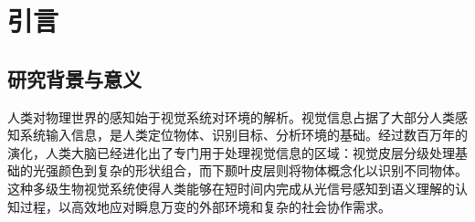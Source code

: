 
\chapter{引言}
\section{研究背景与意义}



人类对物理世界的感知始于视觉系统对环境的解析。视觉信息占据了大部分人类感知系统输入信息，是人类定位物体、识别目标、分析环境的基础。经过数百万年的演化，人类大脑已经进化出了专门用于处理视觉信息的区域：视觉皮层分级处理基础的光强颜色到复杂的形状组合，而下颞叶皮层则将物体概念化以识别不同物体。这种多级生物视觉系统使得人类能够在短时间内完成从光信号感知到语义理解的认知过程，以高效地应对瞬息万变的外部环境和复杂的社会协作需求。


